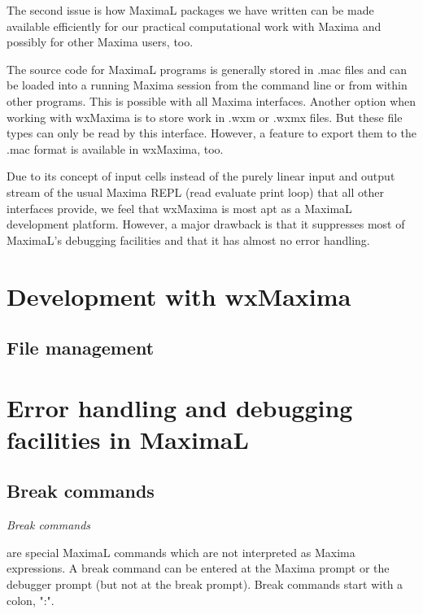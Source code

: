 \documentclass[../Maxima_Workbook.tex]{subfiles}
\begin{document}
\lz The second issue is how MaximaL packages we have written can be made available efficiently for our practical computational work with Maxima and possibly for other Maxima users, too.

\lz The source code for MaximaL programs is generally stored in .mac files and can be loaded into a running Maxima session from the command line or from within other programs. This is possible with all Maxima interfaces. Another option when working with wxMaxima is to store work in .wxm or .wxmx files. But these file types can only be read by this interface. However, a feature to export them to the .mac format is available in wxMaxima, too. 

\lz Due to its concept of input cells instead of the purely linear input and output stream of the usual Maxima REPL (read evaluate print loop) that all other interfaces provide, we feel that wxMaxima is most apt as a MaximaL development platform. However, a major drawback is that it suppresses most of MaximaL's debugging facilities and that it has almost no error handling. 

\section{Development with wxMaxima}

\subsection{File management}

\section{Error handling and debugging facilities in MaximaL}

\subsection{Break commands}

\hypertarget{break command}{\emph{Break commands}} are special MaximaL commands which are not interpreted as Maxima expressions. A break command can be entered at the Maxima prompt or the debugger prompt (but not at the break prompt). Break commands start with a colon, ":". 
\end{document}
